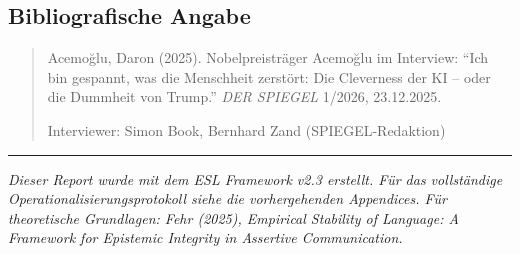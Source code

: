 \subsection{Bibliografische Angabe}

\begin{quote}
Acemo\u{g}lu, Daron (2025). Nobelpreistr\"ager Acemo\u{g}lu im Interview: ``Ich bin gespannt, was die Menschheit zerst\"ort: Die Cleverness der KI -- oder die Dummheit von Trump.'' \emph{DER SPIEGEL} 1/2026, 23.12.2025.

Interviewer: Simon Book, Bernhard Zand (SPIEGEL-Redaktion)
\end{quote}

\vspace{1em}
\noindent\rule{\textwidth}{0.5pt}
\small
\emph{Dieser Report wurde mit dem ESL Framework v2.3 erstellt. F\"ur das vollst\"andige Operationalisierungsprotokoll siehe die vorhergehenden Appendices. F\"ur theoretische Grundlagen: Fehr (2025), Empirical Stability of Language: A Framework for Epistemic Integrity in Assertive Communication.}
